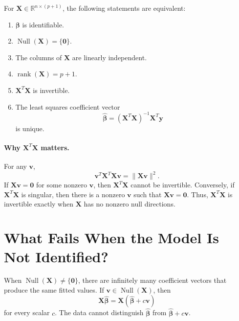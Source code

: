 For \(\mathbf{X}\in\mathbb{R}^{n\times(p+1)}\), the following statements are equivalent:
\begin{enumerate}
  \item \(\boldsymbol{\beta}\) is identifiable.
  \item \(\operatorname{Null}(\mathbf{X})=\{\mathbf{0}\}\).
  \item The columns of \(\mathbf{X}\) are linearly independent.
  \item \(\operatorname{rank}(\mathbf{X})=p+1\).
  \item \(\mathbf{X}^T\mathbf{X}\) is invertible.
  \item The least squares coefficient vector
  \begin{equation}
    \widehat{\boldsymbol{\beta}}=(\mathbf{X}^T\mathbf{X})^{-1}\mathbf{X}^T\mathbf{y}
  \end{equation}
  is unique.
\end{enumerate}

\paragraph{Why \(\mathbf{X}^T\mathbf{X}\) matters.}
For any \(\mathbf{v}\),
\begin{equation}
  \mathbf{v}^T\mathbf{X}^T\mathbf{X}\mathbf{v}=\|\mathbf{X}\mathbf{v}\|^2.
\end{equation}
If \(\mathbf{X}\mathbf{v}=\mathbf{0}\) for some nonzero \(\mathbf{v}\), then \(\mathbf{X}^T\mathbf{X}\) cannot be invertible.  Conversely, if \(\mathbf{X}^T\mathbf{X}\) is singular, then there is a nonzero \(\mathbf{v}\) such that \(\mathbf{X}\mathbf{v}=\mathbf{0}\).  Thus, \(\mathbf{X}^T\mathbf{X}\) is invertible exactly when \(\mathbf{X}\) has no nonzero null directions.

\section{What Fails When the Model Is Not Identified?}

When \(\operatorname{Null}(\mathbf{X})\ne\{\mathbf{0}\}\), there are infinitely many coefficient vectors that produce the same fitted values.  If \(\mathbf{v}\in\operatorname{Null}(\mathbf{X})\), then
\begin{equation}
  \mathbf{X}\widehat{\boldsymbol{\beta}}
  =\mathbf{X}(\widehat{\boldsymbol{\beta}}+c\mathbf{v})
\end{equation}
for every scalar \(c\).  The data cannot distinguish \(\widehat{\boldsymbol{\beta}}\) from \(\widehat{\boldsymbol{\beta}}+c\mathbf{v}\).

